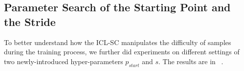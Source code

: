 \subsection{Parameter Search of the Starting Point and the Stride}
\label{sec:params}

To better understand how the ICL-SC manipulates the difficulty of samples during the training process, we further did experiments on different settings of two newly-introduced hyper-parameters $p_{start}$ and $s$. The results are in ~.

\begin{figure}[h]
	\centering
	\begin{minipage}[t]{0.5\linewidth}
		\centering
	\end{minipage}%
	\begin{minipage}[t]{0.5\linewidth}
		\centering
\end{minipage}
\end{figure}
